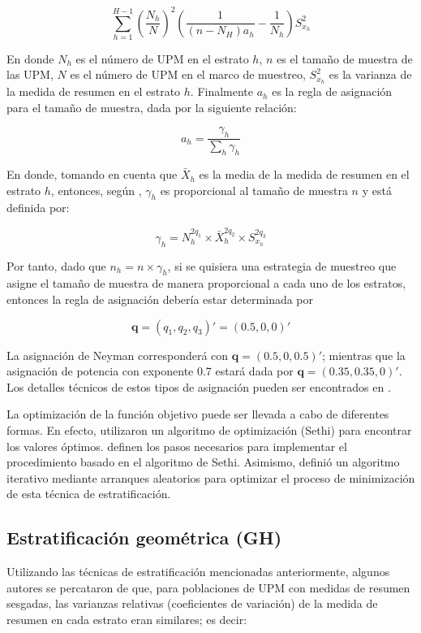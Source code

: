 \documentclass[
  12pt,
  spanish,
]{book}
\begin{document}
\[
\sum_{h=1}^{H-1} \left(\frac{N_h}{N}\right)^2\left(\frac{1}{(n-N_H)a_h}-\frac{1}{N_h}\right) S^2_{x_h}
\]

En donde \(N_h\) es el número de UPM en el estrato \(h\), \(n\) es el tamaño de muestra de las UPM, \(N\) es el número de UPM en el marco de muestreo, \(S^2_{x_h}\) es la varianza de la medida de resumen en el estrato \(h\). Finalmente \(a_h\) es la regla de asignación para el tamaño de muestra, dada por la siguiente relación:

\[
a_h = \frac{\gamma_h}{\sum_h \gamma_h}
\]

En donde, tomando en cuenta que \(\bar{X}_h\) es la media de la medida de resumen en el estrato \(h\), entonces, según \citep{Baillargeon_Rivest_2011}, \(\gamma_h\) es proporcional al tamaño de muestra \(n\) y está definida por:

\[
\gamma_h = N_h^{2q_1} \times  \bar{X}_h^{2q_2} \times S^{2q_3}_{x_h}
\]

Por tanto, dado que \(n_h = n \times \gamma_h\), si se quisiera una estrategia de muestreo que asigne el tamaño de muestra de manera proporcional a cada uno de los estratos, entonces la regla de asignación debería estar determinada por

\[
\mathbf q = (q_1, q_2, q_3)' = (0.5, 0, 0)'
\]

La asignación de Neyman corresponderá con \(\mathbf q = (0.5, 0, 0.5)'\); mientras que la asignación de potencia con exponente 0.7 estará dada por \(\mathbf q = (0.35, 0.35, 0)'\). Los detalles técnicos de estos tipos de asignación pueden ser encontrados en \citet{Gutierrez_2016}.

La optimización de la función objetivo puede ser llevada a cabo de diferentes formas. En efecto, \citet{Lavallee_Hidiroglou_1988} utilizaron un algoritmo de optimización (Sethi) para encontrar los valores óptimos. \citet{Baillargeon_Rivest_Ferland_2007} definen los pasos necesarios para implementar el procedimiento basado en el algoritmo de Sethi. Asimismo, \citet{Kozak_2004} definió un algoritmo iterativo mediante arranques aleatorios para optimizar el proceso de minimización de esta técnica de estratificación.

\hypertarget{estratificaciuxf3n-geomuxe9trica-gh}{%
\subsection{Estratificación geométrica (GH)}\label{estratificaciuxf3n-geomuxe9trica-gh}}

Utilizando las técnicas de estratificación mencionadas anteriormente, algunos autores se percataron de que, para poblaciones de UPM con medidas de resumen sesgadas, las varianzas relativas (coeficientes de variación) de la medida de resumen en cada estrato eran similares; es decir:
\end{document}
